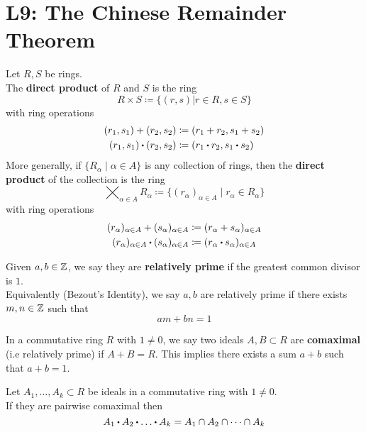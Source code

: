 \documentclass[../Main.tex]{subfiles}
\begin{document}
\chapter{L9: The Chinese Remainder Theorem}
\begin{dfn}[title = Direct Product]
	Let $R,S$ be rings.\\
	The \textbf{direct product} of $R$ and $S$ is the ring
	\[R\times S \coloneqq \{(r,s)|r\in R, s\in S \}\]
	with ring operations
	\begin{align*}
		(r_1,s_1)+(r_2,s_2)&\coloneqq (r_1+r_2,s_1+s_2)\\
		(r_1,s_1)\rdot (r_2,s_2)&\coloneqq (r_1\rdot r_2,s_1\rdot s_2)
	\end{align*}
	More generally, if $\{R_\alpha\mid \alpha\in A\}$ is any collection of rings, then the \textbf{direct product} of the collection is the ring
	\[\bigtimes_{\alpha \in A}R_\alpha \coloneqq \{(r_\alpha)_{\alpha\in A}\mid  r_\alpha \in R_\alpha\}\]
	with ring operations
	\begin{align*}
	(r_\alpha)_{\alpha\in A}+(s_\alpha)_{\alpha\in A}&\coloneqq (r_\alpha +s_\alpha)_{\alpha\in A}\\
	(r_\alpha)_{\alpha\in A}\rdot (s_\alpha)_{\alpha\in A}&\coloneqq (r_\alpha \rdot s_\alpha)_{\alpha\in A}
	\end{align*}
\end{dfn}
\begin{dfn}[title = Relatively Prime Integers]
Given $a,b\in \mathbb{Z}$, we say they are \textbf{relatively prime} if the greatest common divisor is $1$.\\
Equivalently (Bezout's Identity), we say $a,b$ are relatively prime if there exists $m,n\in\mathbb{Z}$ such that \[am+bn=1\]
\end{dfn}
\begin{dfn}[title = Comaximal Ideals]
	In a commutative ring $R$ with $1\ne 0$, we say two ideals $A,B\subset R$ are \textbf{comaximal} (i.e relatively prime) if $A+B=R$. This implies there exists a sum $a+b$ such that $a+b=1$.
\end{dfn}
\begin{thm}[title = Product of pairwise comaximals is intersection]
	Let $A_1,\dots,A_k\subset R$ be ideals in a commutative ring with $1\ne 0$.\\
	If they are pairwise comaximal then
	\[A_1\rdot A_2\rdot \dots \rdot A_k = A_1 \cap A_2 \cap \dots \cap A_k\]
\end{thm}
\end{document}
